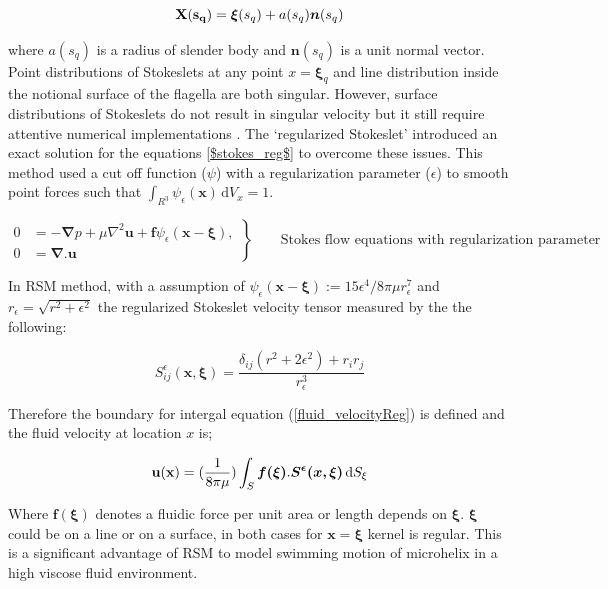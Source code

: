 \documentclass[12pt,a4paper,titlepage]{report}
\begin{document}
\begin{equation}
\bold {X(s_q)} = \bm{\xi}(s_q) + a(s_q) \bm{n}(s_q)
\label{centreline}
\end{equation}

where $a(s_q)$ is a radius of slender body and $\bm{n}(s_q)$ is a unit normal vector. Point distributions of 
Stokeslets at any point $x = \bm{\xi}_q$ and line distribution inside the notional surface
of the flagella are both singular. However, surface distributions of Stokeslets do not result in singular  velocity
 but it still require attentive numerical implementations \citep{smith2009boundary}. The \lq{regularized Stokeslet}\rq{}
 introduced an exact solution for the equations \ref{$stokes_reg$} to overcome these issues. 
This method used a cut off function ($\psi$) with a regularization parameter ($\epsilon$) to smooth point forces 
such that $\int_{R^3} \psi_{\epsilon} (\bm{x})\, \mathrm{d}V_x = 1$.



\begin{equation}
 \left.\begin{aligned}
        0 &= - \bm{\nabla} p + \mu \nabla ^ 2 \bm{u} + \bm{f} \psi_\epsilon (\bm{x} - \bm{\xi}), \\
        0 &=\bm{\nabla . u}
       \end{aligned}
 \right\}
 \qquad \text{Stokes flow equations with regularization parameter}
\label{stokes_reg}
\end{equation}

In RSM method, with a assumption of $\psi_{\epsilon}(\bm{x} - \bm{\xi}) := 15\epsilon^4 /8\pi \mu r_{\epsilon}^7$ 
and $r_{\epsilon} = \sqrt{r^2 + \epsilon ^2}$ the regularized Stokeslet velocity tensor measured by the the following:


\begin{equation}
 S _{ij}^{\epsilon} \bm{(x , \xi)} = \frac{\delta _{ij}(r^2 + 2{\epsilon}^2) + r_i r_j}{r_{\epsilon}^3}
\label{velocity-tensor}
\end{equation}

Therefore the boundary for intergal equation (\ref{fluid_velocityReg}) is defined and the fluid velocity at location $x$ is;

\begin{equation}
\bold {u(x)} =(\frac{1}{8 \pi \mu}) \int_S \mathrm \bm{f(\xi)} . \bm{S^{\epsilon}( x, \xi)}\, \mathrm{d}S_{\xi}
\label{fluid_velocityReg}
\end{equation}

Where $\bm{f(\xi)}$ denotes a fluidic force per unit area or length depends on $\bm{\xi}$. $\bm{\xi}$ could be on a
line or on a surface, in both cases for $\bm{x} = \bm{\xi}$ kernel is regular. This is a significant advantage of
\ac*{RSM} to model swimming motion of microhelix in a high viscose fluid environment.
\end{document}
